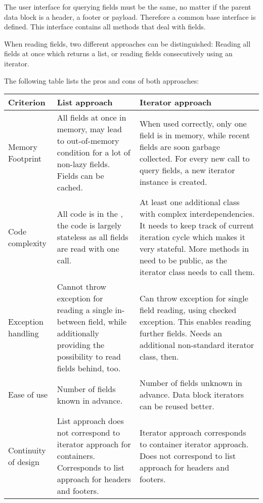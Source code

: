 The user interface for querying fields must be the same, no matter if the parent data block is a header, a footer or payload. Therefore a common base interface \IFFieldSequence{} is defined. This interface contains all methods that deal with fields.

When reading fields, two different approaches can be distinguished: Reading all fields at once which returns a list, or reading fields consecutively using an iterator.

The following table lists the pros and cons of both approaches:

\begin{longtable}{|p{}|p{}|p{}|}
	\hline
	Criterion & List approach & Iterator approach\\
	\endhead
	\hline
	Memory Footprint & All fields at once in memory, may lead to out-of-memory condition for a lot of non-lazy fields. Fields can be cached. & When used correctly, only one field is in memory, while recent fields are soon garbage collected. For every new call to query fields, a new iterator instance is created.\\
	\hline
	Code complexity & All code is in the \IFDataFormatReader{}, the code is largely stateless as all fields are read with one call. & At least one additional class with complex interdependencies. It needs to keep track of current iteration cycle which makes it very stateful. More methods in \IFDataFormatReader{} need to be public, as the iterator class needs to call them.\\
	\hline
	Exception handling & Cannot throw exception for reading a single in-between field, while additionally providing the possibility to read fields behind, too. & Can throw exception for single field reading, using checked exception. This enables reading further fields. Needs an additional non-standard iterator class, then.\\
	\hline
	Ease of use & Number of fields known in advance. & Number of fields unknown in advance. Data block iterators can be reused better.\\
	\hline
	Continuity of design & List approach does not correspond to iterator approach for containers. Corresponds to list approach for headers and footers. & Iterator approach corresponds to container iterator approach. Does not correspond to list approach for headers and footers.\\
	\hline
\end{longtable}

